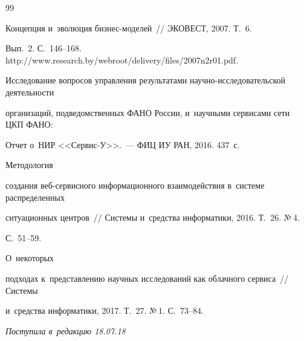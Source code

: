 {{\begin{thebibliography}{99}


 Концепция и~эволюция бизнес-моделей~/\!\!/ ЭКОВЕСТ, 2007. Т.~6. 


Вып.~2. С.~146--168. {\sf http://www.research.by/webroot/delivery/files/2007n2r01.pdf}.




Исследование вопросов управления результатами научно-исследовательской деятельности 


организаций, подведомственных ФАНО России, и~научными сервисами сети ЦКП ФАНО: 


Отчет о~НИР <<Сервис-У>>.~--- ФИЦ ИУ РАН, 2016. 437~с.







 Методология 


создания веб-сервисного информационного взаимодействия в~системе распределенных 


ситуационных центров~/\!\!/ Системы и~средства информатики, 2016. Т.~26. №\,4.  


С.~51--59.







 О~некоторых 


подходах к~представлению научных исследований как облачного сервиса~/\!\!/ Системы 


и~средства информатики, 2017. Т.~27. №\,1. С.~73--84.





        \end{thebibliography}


} }








\vspace*{-3pt}





\hfill{\small\textit{Поступила в~редакцию 18.07.18}}














